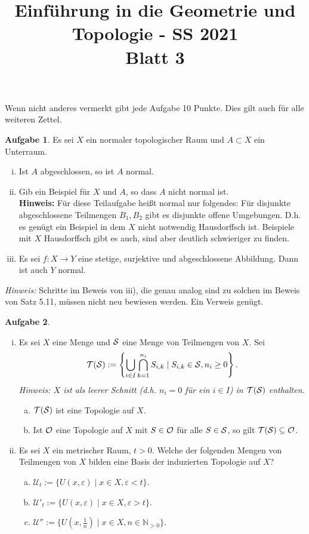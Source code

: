 \documentclass{article}
\title{Einführung in die Geometrie und Topologie - SS 2021\\
Blatt 3}
\date{}
\theoremstyle{definition}
\newtheorem{aufgabe}{Aufgabe}
\theoremstyle{remark}
\newcommand{\N}{\mathbb{N}}
\begin{document}
\maketitle
\thispagestyle{fancy}
\cfoot{}
\renewcommand{\headrulewidth}{0pt}
\renewcommand{\footrulewidth}{0.4pt}
Wenn nicht anderes vermerkt gibt jede Aufgabe 10 Punkte. Dies gilt auch für alle weiteren Zettel.

\begin{aufgabe}Es sei $X$ ein normaler topologischer Raum und $A\subset X$ ein Unterraum.
\begin{enumerate}[i)]
	\item Ist $A$ abgeschlossen, so ist $A$ normal.
	\item Gib ein Beispiel für $X$ und $A$, so dass $A$ nicht normal ist.\\
	\textbf{Hinweis:} Für diese Teilaufgabe heißt normal nur folgendes: Für disjunkte abgeschlossene Teilmengen $B_1,B_2$ gibt es disjunkte offene Umgebungen. D.h. es genügt ein Beispiel in dem $X$ nicht notwendig Hausdorffsch ist. Beispiele mit $X$ Hausdorffsch gibt es auch, sind aber deutlich schwieriger zu finden.
	\item Es sei $f\colon X\to Y$ eine stetige, surjektive und abgeschlossene Abbildung. Dann ist auch $Y$ normal.
\end{enumerate}
\emph{Hinweis:} Schritte im Beweis von iii), die genau analog sind zu solchen im Beweis von Satz 5.11, müssen nicht neu bewiesen werden. Ein Verweis genügt.
\end{aufgabe}
\begin{aufgabe}
	\begin{enumerate}[i)]
		\item Es sei $X$ eine Menge und $\mathcal S$ eine Menge von Teilmengen von
		$X$. Sei
		\[ \mathcal T(\mathcal S) := \left\{ \bigcup_{i\in I} \bigcap_{k=1}^{n_i} S_{i,k}\mid S_{i,k}\in \mathcal S, n_i\geq 0 \right\}. \]
		\emph{Hinweis: $X$ ist als leerer Schnitt (d.h. $n_i=0$ für ein $i\in I$) in $\mathcal T(\mathcal S)$ enthalten.}
		\begin{enumerate}[a)]
			\item ${\mathcal T}(\mathcal S)$ ist eine Topologie auf $X$.
			\item Ist $\mathcal O$ eine Topologie auf $X$ mit $S\in \mathcal O$ für alle $S\in\mathcal S$, so gilt $\mathcal T(\mathcal S)\subseteq\mathcal O$.
		\end{enumerate}
		\item Es sei $X$ ein metrischer Raum, $t>0$. Welche der folgenden Mengen von Teilmengen von $X$ bilden eine Basis der induzierten Topologie auf $X$?
		\begin{enumerate}[a)]
			\item $\mathcal U_t :=\{ U(x, \varepsilon)\mid x\in X, \varepsilon < t\} $.
			\item $\mathcal U'_t :=\{ U(x, \varepsilon)\mid x\in X, \varepsilon > t\} $.
			\item $\mathcal U'' :=\{ U(x,\tfrac{1}{n})\mid x\in X, n\in\N_{>0}\} $.
		\end{enumerate}
	\end{enumerate}
\end{aufgabe}
\end{document}
